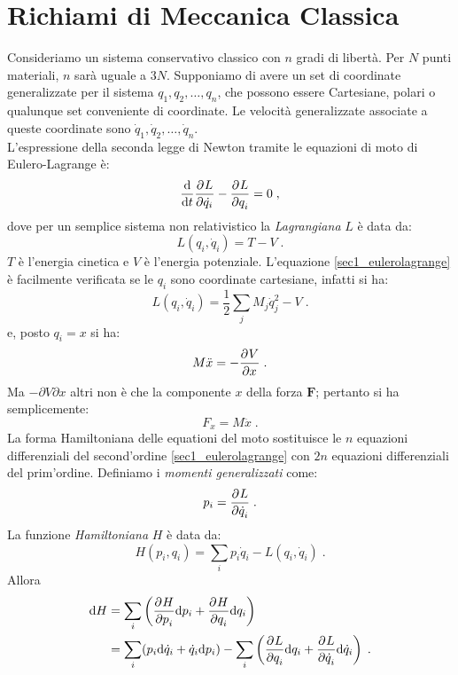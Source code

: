 \section{Richiami di Meccanica Classica}
Consideriamo un sistema conservativo classico con $n$ gradi di libertà. Per $N$ punti materiali, $n$ sarà uguale a  $3N$. Supponiamo di 
avere un set di coordinate generalizzate per il sistema $q_1,q_2,\ldots,q_n$, che possono essere Cartesiane, polari o qualunque set 
conveniente di coordinate. Le velocità generalizzate associate a queste coordinate sono $\dot{q}_1,\dot{q}_2,\ldots, \dot{q}_n$. \\
L'espressione della seconda legge di Newton tramite le equazioni di moto di Eulero-Lagrange è:
\begin{equation}
\label{sec1_eulerolagrange}
\frac{\mathrm{d}}{\mathrm{d}{t}}\frac{\partial^{}L}{\partial \dot{q_i}^{}}-\frac{\partial^{}L}{\partial q_i^{}}=0\;,
\end{equation}
dove per un semplice sistema non relativistico la \textit{Lagrangiana} $L$ è data da:
\begin{equation}
L(q_i,\dot{q}_i)=T-V\;.
\end{equation}
$T$ è l'energia cinetica e $V$ è l'energia potenziale. L'equazione \eqref{sec1_eulerolagrange} è facilmente verificata se le $q_i$ sono coordinate cartesiane, infatti si ha:
\begin{equation}
L(q_i,\dot{q}_i)=\frac{1}{2}\sum_j M_j\dot{q}_j^2 - V\;.
\end{equation}
e, posto $q_i=x$ si ha:
\begin{equation}
 M\ddot{x}=-\frac{\partial^{}V}{\partial x^{}}\;.
\end{equation}
Ma $-\partial V\partial x$ altri non è che la componente $x$ della forza $\mathbf{F}$; pertanto si ha semplicemente:
\begin{equation}
 F_x=M\ddot{x}\;.
\end{equation}
La forma Hamiltoniana delle equationi del moto sostituisce le $n$ equazioni differenziali del second'ordine \eqref{sec1_eulerolagrange} con $2n$ equazioni differenziali del prim'ordine. Definiamo i \textit{momenti generalizzati} come:
\begin{equation}
\label{sec1_generalizedmomenta}
 p_i=\frac{\partial^{}L}{\partial \dot{q}_i^{}}\;.
\end{equation}
La funzione \textit{Hamiltoniana} $H$ è data da:
\begin{equation}
H(p_i,q_i)=\sum_i p_i\dot{q}_i - L(q_i,\dot{q}_i)\;.
\end{equation}
Allora
\begin{align}
\mathrm{d}{H} &= \sum_i\left(\frac{\partial^{}H}{\partial p_i^{}}\mathrm{d}{p_i}+\frac{\partial^{}H}{\partial q_i^{}}\mathrm{d}{q_i}\right) \notag \\
&=\sum_i(p_i\mathrm{d}{\dot{q}_i}+\dot{q}_i\mathrm{d}{p_i})-\sum_i\left(\frac{\partial^{}L}{\partial q_i^{}}\mathrm{d}{q_i}+\frac{\partial^{}L}{\partial \dot{q}_i^{}}\mathrm{d}{\dot{q}_i}\right)\;. \label{sec1_diffham}
\end{align}
